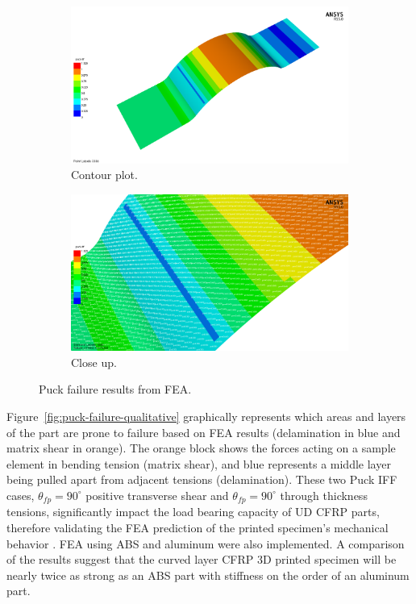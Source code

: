 \begin{figure}[t]
        \centering
        \begin{subfigure}[b]{0.4\linewidth}
                \includegraphics[width=\linewidth]{./figures/fea/fea-acp-pfailure-notext}
                \caption{Contour plot.}
                \label{fig:fea-acp-pfailure-notext}
        \end{subfigure}
        \begin{subfigure}[b]{0.4\linewidth}
                \includegraphics[width=\linewidth]{./figures/fea/fea-acp-pfailure-mode-layer-closeup}
                \caption{Close up.}
                \label{fig:fea-acp-pfailure-mode-layer-closeup}
        \end{subfigure}
        \caption{Puck failure results from FEA.}\label{fig:puck-results}
\end{figure}

Figure~\ref{fig:puck-failure-qualitative} graphically represents which areas and layers of the part are prone to failure based on FEA results (delamination in blue and matrix shear in orange). The orange block shows the forces acting on a sample element in bending tension (matrix shear), and blue represents a middle layer being pulled apart from adjacent tensions (delamination). These two Puck IFF cases, $\theta_{fp}=90^{\circ}$ positive transverse shear and $\theta_{fp}=90^{\circ}$ through thickness tensions, significantly impact the load bearing capacity of UD CFRP parts, therefore validating the FEA prediction of the printed specimen's mechanical behavior \cite{Puck-Stuttgard}. FEA using ABS and aluminum were also implemented. A comparison of the results suggest that the curved layer CFRP 3D printed specimen will be nearly twice as strong as an ABS part with stiffness on the order of an aluminum part.

